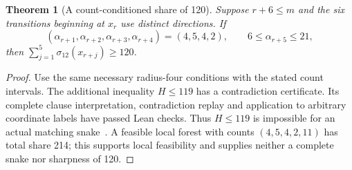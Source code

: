 \documentclass[11pt,a4paper]{article}
\newtheorem{theorem}{Theorem}[section]
\theoremstyle{definition}
\theoremstyle{remark}
\begin{document}
\begin{theorem}[A count-conditioned share of 120]\label{thm:share120}
Suppose $r+6\le m$ and the six transitions beginning at $x_r$ use distinct
directions. If
\[
(\alpha_{r+1},\alpha_{r+2},\alpha_{r+3},\alpha_{r+4})=(4,5,4,2),
\qquad 6\le\alpha_{r+5}\le21,
\]
then $\sum_{j=1}^{5}\sigma_{12}(x_{r+j})\ge120$.
\end{theorem}
\begin{proof}
Use the same necessary radius-four conditions with the stated count intervals. The additional inequality $H\le119$ has a contradiction certificate. Its complete clause interpretation, contradiction replay and application to arbitrary coordinate labels have passed Lean checks. Thus $H\le119$ is impossible for an actual matching snake~\cite{countfreearchive}. A feasible local forest with counts $(4,5,4,2,11)$ has total share 214; this supports local feasibility and supplies neither a complete snake nor sharpness of 120.
\end{proof}
\end{document}
